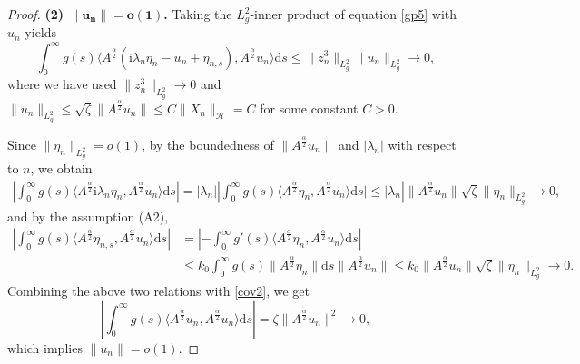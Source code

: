 \documentclass[12pt,reqno]{article}
\begin{document}
\begin{proof}
		{\bf \noindent(2) $\bm{\|u_n\|=o(1)}$.}
		Taking the $L_g^2$-inner product of equation \eqref{gp5} with $u_n$ yields
		\begin{equation}\label{cov2}
			\int_{0}^{\infty} g(s)\langle A^{\frac{\alpha}{2}}(\mathrm{i}\lambda_{n}\eta_{n}-u_{n}+\eta_{n,s}),A^{\frac{\alpha}{2}}u_{n}\rangle\mathrm{d}s \le\|z^3_n\|_{L^2_g}\|u_n\|_{L^2_g}\to 0,
		\end{equation}
		where we have used $\|z^3_n\|_{L^2_g}\to0$ and $\|u_n\|_{L^2_g}\le\sqrt\zeta\|A^{\frac\alpha2}u_n\|\le C\|X_n\|_{\mathcal{H}}=C$ for some constant $C>0$.
		
		Since $\|\eta_n\|_{L_g^2} =o(1)$, by the boundedness of $\| A^{\frac{\alpha}{2}} u_n \|$ and $|\lambda_n|$ with respect to $n$, we obtain
		\begin{align*}
			\left|\int_{0}^{\infty} g(s)\langle A^{\frac{\alpha}{2}}\mathrm{i}\lambda_{n}\eta_{n},A^{\frac{\alpha}{2}}u_{n}\rangle\mathrm{d}s\right|= |\lambda_{n}|\left|\int_{0}^{\infty} g(s)\langle A^{\frac{\alpha}{2}}\eta_{n},A^{\frac{\alpha}{2}}u_{n}\rangle\mathrm{d}s| \leq |\lambda_{n}\right| \|A^{\frac{\alpha}{2}}u_{n}\|  \sqrt{\zeta} \|\eta_{n}\|_{L_{g}^{2}} \to 0,
		\end{align*}
		and by the assumption (A2),
		\begin{align*}
			\left|\int_{0}^{\infty} g(s)\langle A^{\frac{\alpha}{2}}\eta_{n,s},A^{\frac{\alpha}{2}}u_{n}\rangle\mathrm{d}s\right|&= \left|-\int_{0}^{\infty} g'(s)\langle A^{\frac{\alpha}{2}}\eta_{n},A^{\frac{\alpha}{2}}u_{n}\rangle\mathrm{d}s\right| \\
			&\leq k_{0}\int_{0}^{\infty} g(s)\|A^{\frac{\alpha}{2}}\eta_{n}\|\mathrm{d}s \|A^{\frac{\alpha}{2}}u_{n}\| \leq k_{0}\|A^{\frac{\alpha}{2}}u_{n}\|\sqrt{\zeta}\|\eta_{n}\|_{L_{g}^{2}} \to 0.
		\end{align*}
		Combining the above two relations with 	\eqref{cov2}, we get
		\[
		\left|\int_{0}^{\infty} g(s)\langle A^{\frac{\alpha}{2}}u_{n},A^{\frac{\alpha}{2}}u_{n}\rangle\mathrm{d}s\right|
		= \zeta\|A^{\frac{\alpha}{2}}u_{n}\|^{2}\to0,
		\]
		which implies $\|u_n\|=o(1)$.
		

\end{proof}
\end{document}
